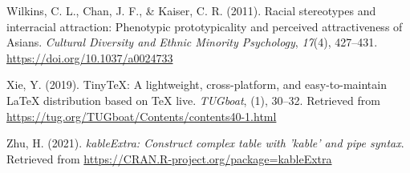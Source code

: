 \documentclass[
  english,
  man, fleqn, noextraspace,floatsintext]{apa6}
\newlength{\cslhangindent}
\newlength{\cslentryspacingunit} %
\newenvironment{CSLReferences}[2] %
 {%
  \setlength{\parindent}{0pt}
  \ifodd #1
  \let\oldpar\par
  \def\par{\hangindent=\cslhangindent\oldpar}
  \fi
  \setlength{\parskip}{#2\cslentryspacingunit}
 }%
 {}
\begin{document}
\begin{CSLReferences}{1}{0}
\leavevmode{}%
Wilkins, C. L., Chan, J. F., \& Kaiser, C. R. (2011). Racial stereotypes and interracial attraction: {Phenotypic} prototypicality and perceived attractiveness of {Asians}. \emph{Cultural Diversity and Ethnic Minority Psychology}, \emph{17}(4), 427--431. \url{https://doi.org/10.1037/a0024733}

\leavevmode{}%
Xie, Y. (2019). TinyTeX: A lightweight, cross-platform, and easy-to-maintain LaTeX distribution based on TeX live. \emph{TUGboat}, (1), 30--32. Retrieved from \url{https://tug.org/TUGboat/Contents/contents40-1.html}

\leavevmode{}%
Zhu, H. (2021). \emph{kableExtra: Construct complex table with 'kable' and pipe syntax}. Retrieved from \url{https://CRAN.R-project.org/package=kableExtra}

\end{CSLReferences}

\endgroup
\end{document}
